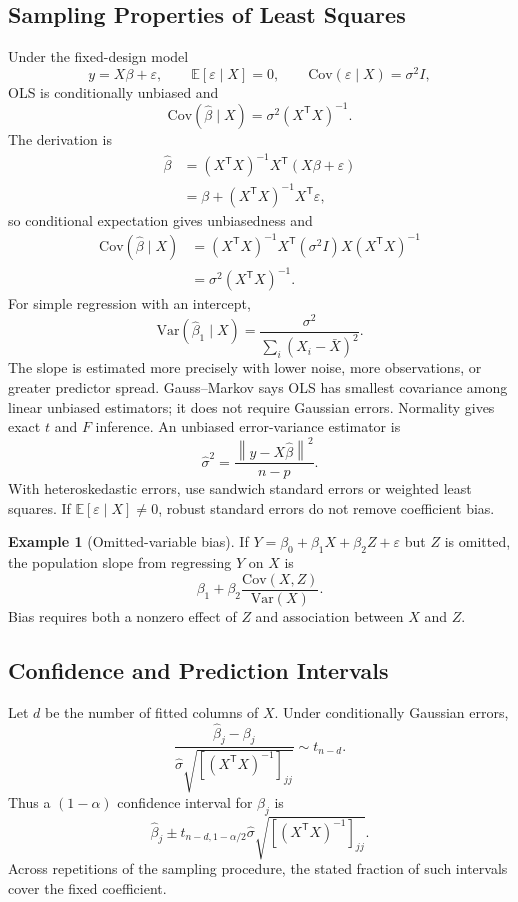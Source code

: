 \documentclass[12pt,oneside]{book}
\numberwithin{equation}{section}
\theoremstyle{definition}
\newtheorem{example}{Example}[section]
\theoremstyle{plain}
\theoremstyle{remark}
\newcommand{\E}{\mathbb{E}}
\newcommand{\Var}{\mathrm{Var}}
\newcommand{\Cov}{\mathrm{Cov}}
\newcommand{\norm}[1]{\left\lVert #1 \right\rVert}
\begin{document}
\subsection{Sampling Properties of Least Squares}

Under the fixed-design model
\[
 y=X\beta+\varepsilon,\qquad
 \E[\varepsilon\mid X]=0,\qquad
 \Cov(\varepsilon\mid X)=\sigma^2I,
\]
OLS is conditionally unbiased and
\[
    \Cov(\widehat\beta\mid X)=\sigma^2(X^\mathsf TX)^{-1}.
\]
The derivation is
\begin{align*}
 \widehat\beta
 &=(X^\mathsf TX)^{-1}X^\mathsf T(X\beta+\varepsilon)\\
 &=\beta+(X^\mathsf TX)^{-1}X^\mathsf T\varepsilon,
\end{align*}
so conditional expectation gives unbiasedness and
\begin{align*}
 \Cov(\widehat\beta\mid X)
 &=(X^\mathsf TX)^{-1}X^\mathsf T(\sigma^2I)
   X(X^\mathsf TX)^{-1}\\
 &=\sigma^2(X^\mathsf TX)^{-1}.
\end{align*}
For simple regression with an intercept,
\[
 \Var(\widehat\beta_1\mid X)
 =\frac{\sigma^2}{\sum_i(X_i-\bar X)^2}.
\]
The slope is estimated more precisely with lower noise, more observations, or
greater predictor spread.
Gauss--Markov says OLS has smallest covariance among linear unbiased
estimators; it does not require Gaussian errors. Normality gives exact $t$ and
$F$ inference. An unbiased error-variance estimator is
\[
    \widehat\sigma^2=\frac{\norm{y-X\widehat\beta}^2}{n-p}.
\]
With heteroskedastic errors, use sandwich standard errors or weighted least
squares. If $\E[\varepsilon\mid X]\neq0$, robust standard errors do not remove
coefficient bias.

\begin{example}[Omitted-variable bias]
If $Y=\beta_0+\beta_1X+\beta_2Z+\varepsilon$ but $Z$ is omitted, the population
slope from regressing $Y$ on $X$ is
\[
    \beta_1+\beta_2\frac{\Cov(X,Z)}{\Var(X)}.
\]
Bias requires both a nonzero effect of $Z$ and association between $X$ and
$Z$.
\end{example}

\subsection{Confidence and Prediction Intervals}

Let $d$ be the number of fitted columns of $X$. Under conditionally Gaussian
errors,
\[
 \frac{\widehat\beta_j-\beta_j}
 {\widehat\sigma\sqrt{[(X^\mathsf TX)^{-1}]_{jj}}}
 \sim t_{n-d}.
\]
Thus a $(1-\alpha)$ confidence interval for $\beta_j$ is
\[
 \widehat\beta_j\pm t_{n-d,1-\alpha/2}
 \widehat\sigma\sqrt{[(X^\mathsf TX)^{-1}]_{jj}}.
\]
Across repetitions of the sampling procedure, the stated fraction of such
intervals cover the fixed coefficient.
\end{document}
